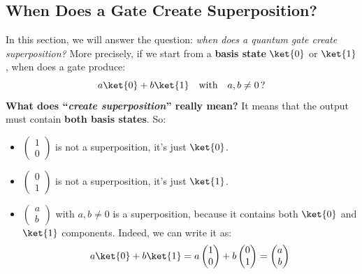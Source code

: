 \subsection{When Does a Gate Create Superposition?}

In this section, we will answer the question: \emph{when does a quantum gate create superposition?} More precisely, if we start from a \textbf{basis state} $\ket{0}$ or $\ket{1}$, when does a gate produce:
\begin{equation*}
    a\ket{0} + b\ket{1} \quad \text{with} \quad a,b \ne 0 \,\text{?}
\end{equation*}
\textcolor{Green3}{ \textbf{What does ``\emph{create superposition}'' really mean?}} It means that the output must contain \textbf{both basis states}. So:
\begin{itemize}
    \item $\begin{pmatrix}
        1 \\ 0
    \end{pmatrix}$ is not a superposition, it's just $\ket{0}$.
    \item $\begin{pmatrix}
        0 \\ 1
    \end{pmatrix}$ is not a superposition, it's just $\ket{1}$.
    \item $\begin{pmatrix}
        a \\ b
    \end{pmatrix}$ with $a,b \ne 0$ is a superposition, because it contains both $\ket{0}$ and $\ket{1}$ components. Indeed, we can write it as:
    \begin{equation*}
        a\ket{0} + b\ket{1} =
        a\begin{pmatrix}
            1 \\ 0
        \end{pmatrix} +
        b\begin{pmatrix}
            0 \\ 1
        \end{pmatrix} =
        \begin{pmatrix}
            a \\ b
        \end{pmatrix}
    \end{equation*}
\end{itemize}

